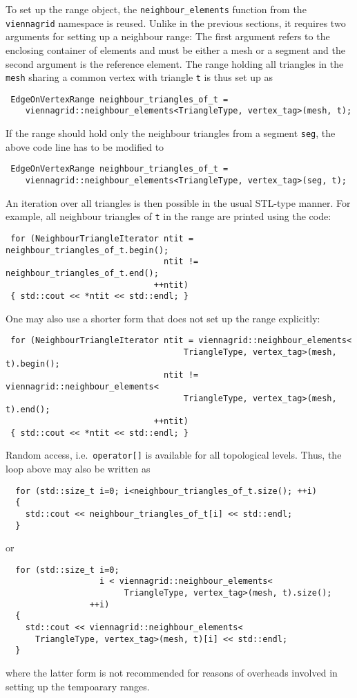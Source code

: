 To set up the range object, the \lstinline|neighbour_elements| function from the \lstinline|viennagrid| namespace is reused. Unlike in the previous sections, it requires two arguments
for setting up a neighbour range: The first argument refers to the enclosing container of elements and must be either a mesh or a segment and the second argument is the reference element.
The range holding all triangles in the \lstinline|mesh| sharing a common vertex with triangle \lstinline|t| is thus set up as
\begin{lstlisting}
 EdgeOnVertexRange neighbour_triangles_of_t =
    viennagrid::neighbour_elements<TriangleType, vertex_tag>(mesh, t);
\end{lstlisting}
If the range should hold only the neighbour triangles from a segment \lstinline|seg|, the above code line has to be modified to
\begin{lstlisting}
 EdgeOnVertexRange neighbour_triangles_of_t =
    viennagrid::neighbour_elements<TriangleType, vertex_tag>(seg, t);
\end{lstlisting}
An iteration over all triangles is then possible in the usual STL-type manner. For example, all neighbour triangles of \lstinline|t| in the range are printed using the code:
\begin{lstlisting}
 for (NeighbourTriangleIterator ntit = neighbour_triangles_of_t.begin();
                                ntit != neighbour_triangles_of_t.end();
                              ++ntit)
 { std::cout << *ntit << std::endl; }
\end{lstlisting}

\pagebreak

One may also use a shorter form that does not set up the range explicitly:
\begin{lstlisting}
 for (NeighbourTriangleIterator ntit = viennagrid::neighbour_elements<
                                    TriangleType, vertex_tag>(mesh, t).begin();
                                ntit != viennagrid::neighbour_elements<
                                    TriangleType, vertex_tag>(mesh, t).end();
                              ++ntit)
 { std::cout << *ntit << std::endl; }
\end{lstlisting}

Random access, i.e.~\lstinline|operator[]| is available for all topological levels. Thus, the loop above may also be written as
\begin{lstlisting}
  for (std::size_t i=0; i<neighbour_triangles_of_t.size(); ++i)
  {
    std::cout << neighbour_triangles_of_t[i] << std::endl;
  }
\end{lstlisting}
or
\begin{lstlisting}
  for (std::size_t i=0;
                   i < viennagrid::neighbour_elements<
                        TriangleType, vertex_tag>(mesh, t).size();
                 ++i)
  {
    std::cout << viennagrid::neighbour_elements<
      TriangleType, vertex_tag>(mesh, t)[i] << std::endl;
  }
\end{lstlisting}
where the latter form is not recommended for reasons of overheads involved in setting up the tempoarary ranges.

